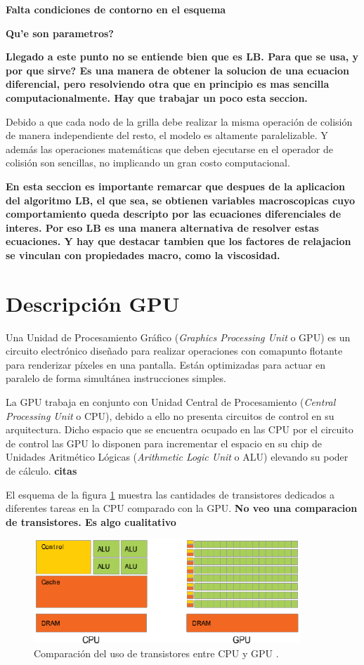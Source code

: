 \textbf{Falta condiciones de contorno en el esquema}


\textbf{Qu’e son parametros?}

\textbf{Llegado a este punto no se entiende bien que es LB. Para que se usa, y por que sirve? Es una manera de obtener la solucion de una ecuacion diferencial, pero resolviendo otra que en principio es mas sencilla computacionalmente. Hay que trabajar un poco esta seccion.}

Debido a que cada nodo de la grilla debe realizar la misma operación de colisión de manera independiente del resto, el modelo es altamente paralelizable. Y además las operaciones matemáticas que deben ejecutarse en el operador de colisión son sencillas, no implicando un gran costo computacional.

\textbf{En esta seccion es importante remarcar que despues de la aplicacion del algoritmo LB, el que sea, se obtienen variables macroscopicas cuyo comportamiento queda descripto por las ecuaciones diferenciales de interes. Por eso LB es una manera alternativa de resolver estas ecuaciones. Y hay que destacar tambien que los factores de relajacion se vinculan con propiedades macro, como la viscosidad.}

\newpage
\section{Descripción GPU}

Una Unidad de Procesamiento Gráfico (\textit{Graphics Processing Unit} o GPU) es un  circuito electrónico diseñado para realizar operaciones con comapunto flotante para renderizar píxeles en una pantalla. Están optimizadas para actuar en paralelo de forma simultánea instrucciones simples.

La GPU trabaja en conjunto con Unidad Central de Procesamiento (\textit{Central Processing Unit} o CPU), debido a ello no presenta circuitos de control en su arquitectura. Dicho espacio que se encuentra ocupado en las CPU por el circuito de control las GPU lo disponen para incrementar el espacio en su chip de Unidades Aritmético Lógicas (\textit{Arithmetic Logic Unit} o ALU) elevando su poder de cálculo. \textbf{citas}

El esquema de la figura \ref{fig:cpu_gpu_transis} muestra las cantidades de transistores dedicados a diferentes tareas en la CPU comparado con la GPU.
\textbf{No veo una comparacion de transistores. Es algo cualitativo}

\begin{figure}[h!]
	\centering
	\includegraphics[width=10cm]{cpu_gpu.png}
	\caption{Comparación del uso de transistores entre CPU y GPU \cite{rinaldi2011modelos}.}
	\label{fig:cpu_gpu_transis}
\end{figure}

